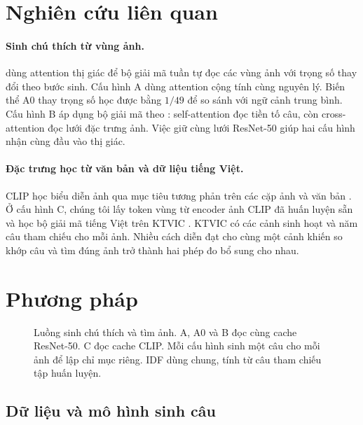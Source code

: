 \documentclass[a4paper,11pt]{article}
\newcommand{\modelA}{\textsc{A}}
\newcommand{\modelB}{\textsc{B}}
\newcommand{\modelAz}{\textsc{A0}}
\newcommand{\modelC}{\textsc{C}}
\begin{document}
\section{Nghiên cứu liên quan}

\paragraph{Sinh chú thích từ vùng ảnh.}
\citet{xu2015show} dùng attention thị giác để bộ giải mã tuần tự đọc các vùng ảnh với trọng số thay đổi theo bước sinh. Cấu hình \modelA{} dùng attention cộng tính cùng nguyên lý. Biến thể \modelAz{} thay trọng số học được bằng $1/49$ để so sánh với ngữ cảnh trung bình. Cấu hình \modelB{} áp dụng bộ giải mã theo \citet{vaswani2017attention}: self-attention đọc tiền tố câu, còn cross-attention đọc lưới đặc trưng ảnh. Việc giữ cùng lưới ResNet-50 giúp hai cấu hình nhận cùng đầu vào thị giác.

\paragraph{Đặc trưng học từ văn bản và dữ liệu tiếng Việt.}
CLIP học biểu diễn ảnh qua mục tiêu tương phản trên các cặp ảnh và văn bản \citep{radford2021learning}. Ở cấu hình \modelC{}, chúng tôi lấy token vùng từ encoder ảnh CLIP đã huấn luyện sẵn và học bộ giải mã tiếng Việt trên KTVIC \citep{pham2024ktvic}. KTVIC có các cảnh sinh hoạt và năm câu tham chiếu cho mỗi ảnh. Nhiều cách diễn đạt cho cùng một cảnh khiến so khớp câu và tìm đúng ảnh trở thành hai phép đo bổ sung cho nhau.

\section{Phương pháp}

\begin{figure}[t]
  \centering
  
  \caption{Luồng sinh chú thích và tìm ảnh. A, A0 và B đọc cùng cache ResNet-50. C đọc cache CLIP. Mỗi cấu hình sinh một câu cho mỗi ảnh để lập chỉ mục riêng. IDF dùng chung, tính từ câu tham chiếu tập huấn luyện.}
  \label{fig:architecture}
\end{figure}

\subsection{Dữ liệu và mô hình sinh câu}
\end{document}
